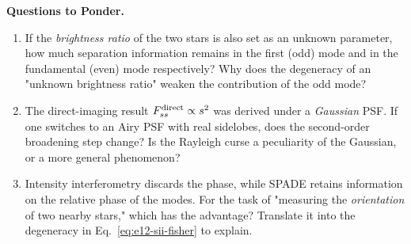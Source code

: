 \medskip
\noindent\textbf{Questions to Ponder.}
\begin{enumerate}
  \item If the \emph{brightness ratio} of the two stars is also set as an unknown parameter, how much separation information remains in the first (odd) mode and in the fundamental (even) mode respectively? Why does the degeneracy of an "unknown brightness ratio" weaken the contribution of the odd mode?
  \item The direct-imaging result $F_{ss}^{\rm direct}\propto s^2$ was derived under a \emph{Gaussian} PSF. If one switches to an Airy PSF with real sidelobes, does the second-order broadening step change? Is the Rayleigh curse a peculiarity of the Gaussian, or a more general phenomenon?
  \item Intensity interferometry discards the phase, while SPADE retains information on the relative phase of the modes. For the task of "measuring the \emph{orientation} of two nearby stars," which has the advantage? Translate it into the degeneracy in Eq.~\eqref{eq:e12-sii-fisher} to explain.
\end{enumerate}
